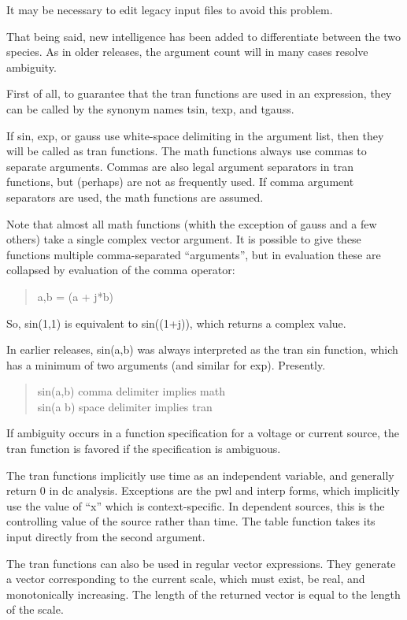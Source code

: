 It may be necessary to edit legacy {\WRspice} input files to avoid
this problem.

That being said, new intelligence has been added to differentiate
between the two species.  As in older releases, the argument count
will in many cases resolve ambiguity.

First of all, to guarantee that the tran functions are used in an
expression, they can be called by the synonym names {\vt tsin}, {\vt
texp}, and {\vt tgauss}.

If {\vt sin}, {\vt exp}, or {\vt gauss} use white-space delimiting in
the argument list, then they will be called as tran functions.  The
math functions always use commas to separate arguments.  Commas are
also legal argument separators in tran functions, but (perhaps) are
not as frequently used.  If comma argument separators are used, the
math functions are assumed.

Note that almost all math functions (whith the exception of {\vt
gauss} and a few others) take a single complex vector argument.  It is
possible to give these functions multiple comma-separated
``arguments'', but in evaluation these are collapsed by evaluation of
the comma operator:
\begin{quote}\vt
a,b = (a + j*b)
\end{quote}
So, {\vt sin(1,1)} is equivalent to {\vt sin((1+j))}, which returns a
complex value.

In earlier {\WRspice} releases, {\vt sin(a,b)} was always interpreted
as the tran {\vt sin} function, which has a minimum of two arguments
(and similar for {\vt exp}).  Presently.
\begin{quote}
{\vt sin(a,b)}  comma delimiter implies math\\
{\vt sin(a b)}  space delimiter implies tran
\end{quote}

If ambiguity occurs in a function specification for a voltage or
current source, the tran function is favored if the specification is
ambiguous.

The tran functions implicitly use time as an independent variable, and
generally return 0 in dc analysis.  Exceptions are the {\vt pwl} and
{\vt interp} forms, which implicitly use the value of ``{\vt x}''
which is context-specific.  In dependent sources, this is the
controlling value of the source rather than time.  The {\vt table}
function takes its input directly from the second argument.

The tran functions can also be used in regular vector expressions. 
They generate a vector corresponding to the current scale, which must
exist, be real, and monotonically increasing.  The length of the
returned vector is equal to the length of the scale.
 
